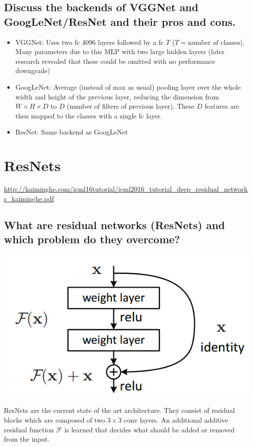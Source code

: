 \subsection{Discuss the backends of VGGNet and GoogLeNet/ResNet and their pros and cons.}
\begin{itemize}
\item VGGNet: Uses two fc 4096 layers followed by a fc $T$ ($T= \text{number of classes}$).  Many parameters due to this MLP with two large hidden layers (later research revealed that these could be omitted with no performance downgrade)
\item GoogLeNet: Average (instead of max as usual) pooling layer over the whole width and height of the previous layer, reducing the dimension from $W\times H\times D$ to $D$ (number of filters of previous layer). These $D$ features are then mapped to the classes with a single fc layer.
\item ResNet: Same backend as GoogLeNet
\end{itemize}
%
\section{ResNets}
\url{http://kaiminghe.com/icml16tutorial/icml2016_tutorial_deep_residual_networks_kaiminghe.pdf}
\subsection{What are residual networks (ResNets) and which problem do they overcome?}
\begin{minipage}{0.4\textwidth}
\includegraphics[width=\textwidth]{./img/residual.png}
\end{minipage}
\begin{minipage}{0.6\textwidth}
ResNets are the current state of the art architecture. They consist of residual blocks which are composed of two $3\times 3$ conv layers. An additional additive residual function $\mathcal F$ is learned that decides what should be added or removed from the input. 
\end{minipage}

